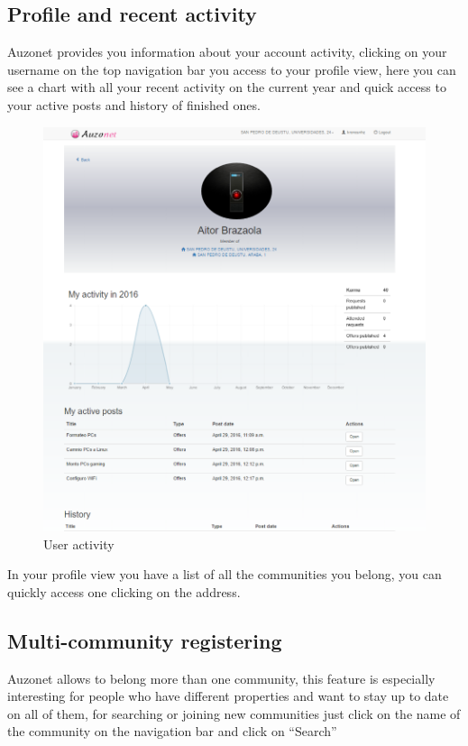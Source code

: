 \documentclass{DeustoFDP}
\begin{document}
\subsection{Profile and recent activity}
Auzonet provides you information about your account activity, clicking on your username on the top navigation bar you access to your profile view, here you can see a chart with all your recent activity on the current year and quick access to your active posts and history of finished ones.

\begin{figure}[h!]
\centering
\includegraphics[width=0.9\linewidth]{fig/Manual/profile}
\caption[User activity]{User activity}
\label{fig:profile}
\end{figure}


In your profile view you have a list of all the communities you belong, you can quickly access one clicking on the address.
\newpage
\subsection{Multi-community registering}
Auzonet allows to belong more than one community, this feature is especially interesting for people who have different properties and want to stay up to date on all of them, for searching or joining new communities just click on the name of the community on the navigation bar and click on “Search”
\end{document}
